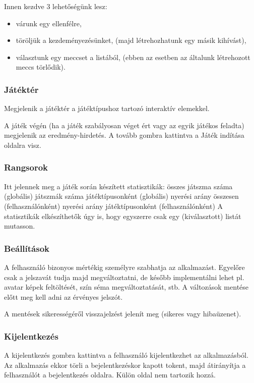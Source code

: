 Innen kezdve 3 lehetőségünk lesz:
\begin{itemize}
	\item várunk egy ellenfélre,
	\item töröljük a kezdeményezésünket, (majd létrehozhatunk egy másik kihívást),
	\item választunk egy meccset a listából, (ebben az esetben az általunk létrehozott meccs törlődik).
\end{itemize}

\subsubsection{Játéktér}
Megjelenik a játéktér a játéktípushoz tartozó interaktív elemekkel.

A játék végén (ha a játék szabályosan véget ért vagy az egyik játékos feladta) megjelenik az eredmény-hirdetés. A tovább gombra kattintva a Játék indítása oldalra visz.

\subsubsection{Rangsorok}
Itt jelennek meg a játék során készített statisztikák:
összes játszma száma (globális)
játszmák száma játéktípusonként (globális)
nyerési arány összesen (felhasználónként)
nyerési arány játéktípusonként (felhasználónként)
A statisztikák elkészíthetők úgy is, hogy egyszerre csak egy (kiválasztott) listát mutasson.

\subsubsection{Beállítások}
A felhasználó bizonyos mértékig személyre szabhatja az alkalmazást. Egyelőre csak a jelszavát tudja majd megváltoztatni, de később implementálni lehet pl. avatar képek feltöltését, szín séma megváltoztatását, stb. A változások mentése előtt meg kell adni az érvényes jelszót.

A mentések sikerességéről visszajelzést jelenít meg (sikeres vagy hibaüzenet).

\subsubsection{Kijelentkezés}
A kijelentkezés gombra kattintva a felhasználó kijelentkezhet az alkalmazásból. Az alkalmazás ekkor törli a bejelentkezéskor kapott tokent, majd átirányítja a felhasználót a bejelentkezés oldalra. Külön oldal nem tartozik hozzá.

